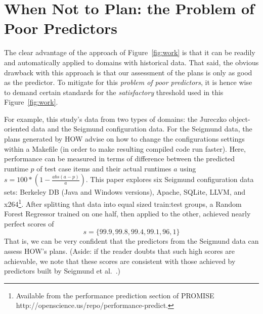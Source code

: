 \documentclass[conference]{IEEEtran}
\newcommand{\fig}[1]{Figure~\ref{fig:#1}}
\begin{document}
\section{When Not to Plan: the Problem of Poor Predictors}

The clear advantage of the approach of \fig{work} is that it can be readily and automatically
applied to domains with historical data. That said, the obvious drawback with this approach
is that our assessment of the plans is only as good as the predictor. To 
mitigate for this {\em problem of poor predictors}, it is hence wise to demand certain standards for the {\em
satisfactory} threshold used in this \fig{work}. 
 

For example, this study's data from two types of domains: the Jureczko   object-oriented data  
and the Seigmund configuration data. 
For the Seigmund data, the plans generated by HOW advise on how  to change the   configurations settings within a Makefile
(in order to make resulting compiled
code  run faster). Here, performance can be measured in terms of  difference
between the predicted runtime $p$ of test case items and their actual runtimes $a$
using  $s= 100*(1- \frac{abs(a - p)}{a})$.
This paper  explores    six Seigmund configuration data sets:  Berkeley DB (Java and Windows versions), Apache, SQLite, LLVM, and
  x264\footnote{Available from the performance prediction section of PROMISE
  http://openscience.us/repo/performance-predict.}. 
  After splitting that data into equal sized train:test groups, a Random Forest
  Regressor trained on one half, then applied to the other, achieved nearly perfect scores of
\[s=\{99.9, 99.8, 99.4, 99.1, 96,1\}\]
That is, we can be very confident that the predictors from the Seigmund data can assess
HOW's plans.
(Aside: if the reader doubts that such high scores are achievable, we note that these scores are 
consistent with those achieved by predictors built by Seigmund et al.~\cite{sven12}.)
\end{document}
